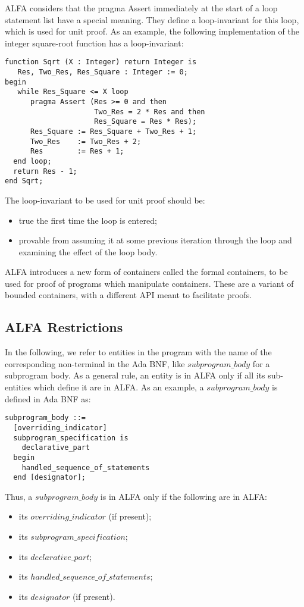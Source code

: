 \documentclass{article}
\newcommand{\bnf}[1]{$\mathit{#1}$}
\begin{document}
ALFA considers that the pragma Assert immediately at the start of a loop
statement list have a special meaning. They define a loop-invariant for this
loop, which is used for unit proof.  As an example, the following
implementation of the integer square-root function has a loop-invariant:

\begin{verbatim}
function Sqrt (X : Integer) return Integer is
   Res, Two_Res, Res_Square : Integer := 0;
begin
   while Res_Square <= X loop
      pragma Assert (Res >= 0 and then
                     Two_Res = 2 * Res and then
                     Res_Square = Res * Res);
      Res_Square := Res_Square + Two_Res + 1;
      Two_Res    := Two_Res + 2;
      Res        := Res + 1;
  end loop;
  return Res - 1;
end Sqrt;
\end{verbatim}

The loop-invariant to be used for unit proof should be:
\begin{itemize}
\item true the first time the loop is entered;
\item provable from assuming it at some previous iteration through the loop and
  examining the effect of the loop body.
\end{itemize}

ALFA introduces a new form of containers called the formal containers, to be
used for proof of programs which manipulate containers. These are a variant of
bounded containers, with a different API meant to facilitate proofs.

\subsection{ALFA Restrictions}

In the following, we refer to entities in the program with the name of the
corresponding non-terminal in the Ada BNF, like \bnf{subprogram\_body} for a
subprogram body. As a general rule, an entity is in ALFA only if all its
sub-entities which define it are in ALFA. As an example, a
\bnf{subprogram\_body} is defined in Ada BNF as:

\begin{verbatim}
subprogram_body ::=
  [overriding_indicator]
  subprogram_specification is
    declarative_part
  begin
    handled_sequence_of_statements
  end [designator];
\end{verbatim}

Thus, a \bnf{subprogram\_body} is in ALFA only if the following are in ALFA:
\begin{itemize}
\item its \bnf{overriding\_indicator} (if present);
\item its \bnf{subprogram\_specification};
\item its \bnf{declarative\_part};
\item its \bnf{handled\_sequence\_of\_statements};
\item its \bnf{designator} (if present).
\end{itemize}
\end{document}
